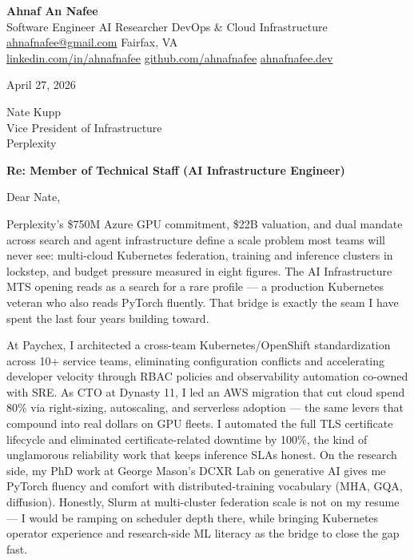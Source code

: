 \documentclass[letterpaper,11pt]{article}
\begin{document}
\begin{center}
  {\LARGE\bfseries\color{accent} Ahnaf An Nafee }\\[3pt]
  {\small Software Engineer \textbar{} AI Researcher \textbar{} DevOps \& Cloud Infrastructure }\\[4pt]
  \small
  \href{mailto:ahnafnafee@gmail.com}{ahnafnafee@gmail.com} \textbar{}
  Fairfax, VA\\
  \href{https://linkedin.com/in/ahnafnafee}{linkedin.com/in/ahnafnafee} \textbar{}
  \href{https://github.com/ahnafnafee}{github.com/ahnafnafee} \textbar{}
  \href{https://www.ahnafnafee.dev}{ahnafnafee.dev}
\end{center}

\vspace{20pt}

April 27, 2026

Nate Kupp\\Vice President of Infrastructure\\Perplexity

\textbf{Re: Member of Technical Staff (AI Infrastructure Engineer)}

Dear Nate,

Perplexity's \$750M Azure GPU commitment, \$22B valuation, and dual mandate across search and agent infrastructure define a scale problem most teams will never see: multi-cloud Kubernetes federation, training and inference clusters in lockstep, and budget pressure measured in eight figures. The AI Infrastructure MTS opening reads as a search for a rare profile --- a production Kubernetes veteran who also reads PyTorch fluently. That bridge is exactly the seam I have spent the last four years building toward.

At Paychex, I architected a cross-team Kubernetes/OpenShift standardization across 10+ service teams, eliminating configuration conflicts and accelerating developer velocity through RBAC policies and observability automation co-owned with SRE. As CTO at Dynasty 11, I led an AWS migration that cut cloud spend 80\% via right-sizing, autoscaling, and serverless adoption --- the same levers that compound into real dollars on GPU fleets. I automated the full TLS certificate lifecycle and eliminated certificate-related downtime by 100\%, the kind of unglamorous reliability work that keeps inference SLAs honest. On the research side, my PhD work at George Mason's DCXR Lab on generative AI gives me PyTorch fluency and comfort with distributed-training vocabulary (MHA, GQA, diffusion). Honestly, Slurm at multi-cluster federation scale is not on my resume --- I would be ramping on scheduler depth there, while bringing Kubernetes operator experience and research-side ML literacy as the bridge to close the gap fast.
\end{document}
